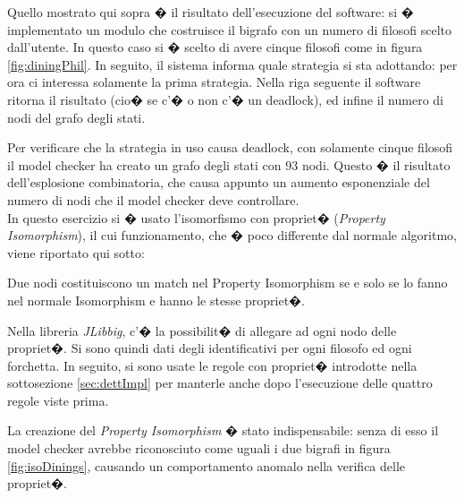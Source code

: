 Quello mostrato qui sopra � il risultato dell'esecuzione del software: si � implementato un modulo che costruisce il bigrafo con un numero di filosofi scelto dall'utente. In questo caso si � scelto di avere cinque filosofi come in figura \ref{fig:diningPhil}. In seguito, il sistema informa quale strategia si sta adottando: per ora ci interessa solamente la prima strategia. Nella riga seguente il software ritorna il risultato (cio� se c'� o non c'� un deadlock), ed infine il numero di nodi del grafo degli stati.

Per verificare che la strategia in uso causa deadlock, con solamente cinque filosofi il model checker ha creato un grafo degli stati con 93 nodi. Questo � il risultato dell'esplosione combinatoria, che causa appunto un aumento esponenziale del numero di nodi che il model checker deve controllare.\\

In questo esercizio si � usato l'isomorfismo con propriet� (\emph{Property Isomorphism}), il cui funzionamento, che � poco differente dal normale algoritmo, viene riportato qui sotto:

\begin{prop}
Due nodi costituiscono un match nel Property Isomorphism se e solo se lo fanno nel normale Isomorphism e hanno le stesse propriet�.
\end{prop}

Nella libreria \emph{JLibbig}, c'� la possibilit� di allegare ad ogni nodo delle propriet�. Si sono quindi dati degli identificativi per ogni filosofo ed ogni forchetta. In seguito, si sono usate le regole con propriet� introdotte nella sottosezione \ref{sec:dettImpl} per manterle anche dopo l'esecuzione delle quattro regole viste prima. 

La creazione del \emph{Property Isomorphism} � stato indispensabile: senza di esso il model checker avrebbe riconosciuto come uguali i due bigrafi in figura \ref{fig:isoDinings}, causando un comportamento anomalo nella verifica delle propriet�. 


